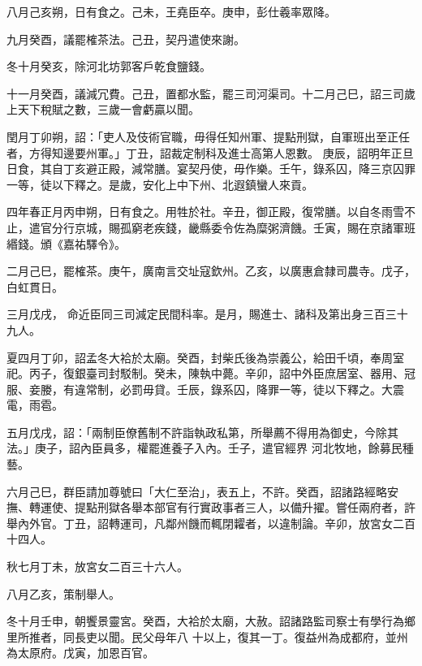 \begin{pinyinscope}
 八月己亥朔，日有食之。己未，王堯臣卒。庚申，彭仕羲率眾降。



 九月癸酉，議罷榷茶法。己丑，契丹遣使來謝。



 冬十月癸亥，除河北坊郭客戶乾食鹽錢。



 十一月癸酉，議減冗費。己丑，置都水監，罷三司河渠司。十二月己巳，詔三司歲上天下稅賦之數，三歲一會虧贏以聞。



 閏月丁卯朔，詔：「吏人及伎術官職，毋得任知州軍、提點刑獄，自軍班出至正任者，方得知邊要州軍。」丁丑，詔裁定制科及進士高第人恩數。
 庚辰，詔明年正旦日食，其自丁亥避正殿，減常膳。宴契丹使，毋作樂。壬午，錄系囚，降三京囚罪一等，徒以下釋之。是歲，安化上中下州、北遐鎮蠻人來貢。



 四年春正月丙申朔，日有食之。用牲於社。辛丑，御正殿，復常膳。以自冬雨雪不止，遣官分行京城，賜孤窮老疾錢，畿縣委令佐為糜粥濟饑。壬寅，賜在京諸軍班緡錢。頒《嘉祐驛令》。



 二月己巳，罷榷茶。庚午，廣南言交址寇欽州。乙亥，以廣惠倉隸司農寺。戊子，白虹貫日。



 三月戊戌，
 命近臣同三司減定民間科率。是月，賜進士、諸科及第出身三百三十九人。



 夏四月丁卯，詔孟冬大袷於太廟。癸酉，封柴氏後為崇義公，給田千頃，奉周室祀。丙子，復銀臺司封駁制。癸未，陳執中薨。辛卯，詔中外臣庶居室、器用、冠服、妾媵，有違常制，必罰毋貸。壬辰，錄系囚，降罪一等，徒以下釋之。大震電，雨雹。



 五月戊戌，詔：「兩制臣僚舊制不許詣執政私第，所舉薦不得用為御史，今除其法。」庚子，詔內臣員多，權罷進養子入內。壬子，遣官經界
 河北牧地，餘募民種藝。



 六月己巳，群臣請加尊號曰「大仁至治」，表五上，不許。癸酉，詔諸路經略安撫、轉運使、提點刑獄各舉本部官有行實政事者三人，以備升擢。嘗任兩府者，許舉內外官。丁丑，詔轉運司，凡鄰州饑而輒閉糶者，以違制論。辛卯，放宮女二百十四人。



 秋七月丁未，放宮女二百三十六人。



 八月乙亥，策制舉人。



 冬十月壬申，朝饗景靈宮。癸酉，大袷於太廟，大赦。詔諸路監司察士有學行為鄉里所推者，同長吏以聞。民父母年八
 十以上，復其一丁。復益州為成都府，並州為太原府。戊寅，加恩百官。




\end{pinyinscope}
